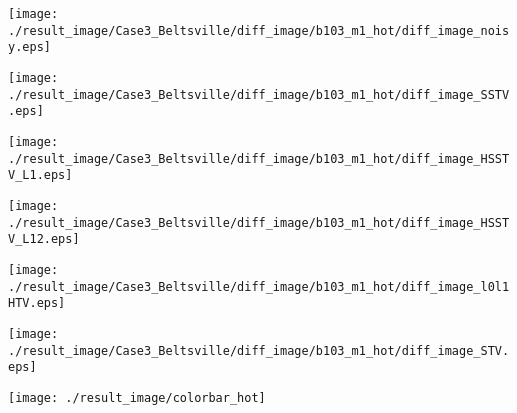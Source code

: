 \begin{figure*}[t]
\begin{center}
		\begin{minipage}{0.125\hsize}
			\centerline{\hspace{\hsize}} %
		\end{minipage}
		\begin{minipage}{0.125\hsize}
			\centerline{\texttt{[image: ./result\_image/Case3\_Beltsville/diff\_image/b103\_m1\_hot/diff\_image\_noisy.eps]}} %
		\end{minipage}
		\begin{minipage}{0.125\hsize}
			\centerline{\texttt{[image: ./result\_image/Case3\_Beltsville/diff\_image/b103\_m1\_hot/diff\_image\_SSTV.eps]}} %
		\end{minipage}
		\begin{minipage}{0.125\hsize}
			\centerline{\texttt{[image: ./result\_image/Case3\_Beltsville/diff\_image/b103\_m1\_hot/diff\_image\_HSSTV\_L1.eps]}} %
		\end{minipage}
		\begin{minipage}{0.125\hsize}
			\centerline{\texttt{[image: ./result\_image/Case3\_Beltsville/diff\_image/b103\_m1\_hot/diff\_image\_HSSTV\_L12.eps]}} %
		\end{minipage}
		\begin{minipage}{0.125\hsize}
			\centerline{\texttt{[image: ./result\_image/Case3\_Beltsville/diff\_image/b103\_m1\_hot/diff\_image\_l0l1HTV.eps]}} %
		\end{minipage}
		\begin{minipage}{0.125\hsize}
			\centerline{\texttt{[image: ./result\_image/Case3\_Beltsville/diff\_image/b103\_m1\_hot/diff\_image\_STV.eps]}} %
		\end{minipage}
		\begin{minipage}{0.050\hsize}
			\centerline{\texttt{[image: ./result\_image/colorbar\_hot]}} %
		\end{minipage}
		
		\vspace{1mm}
		

\end{center}
\end{figure*}
